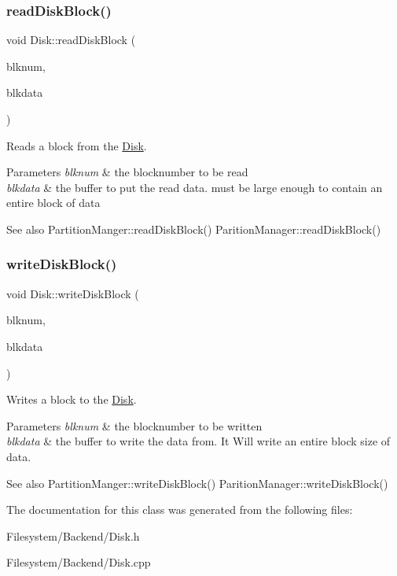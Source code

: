\subsubsection{\texorpdfstring{read\+Disk\+Block()}{readDiskBlock()}}
{\footnotesize\ttfamily void Disk\+::read\+Disk\+Block (\begin{DoxyParamCaption}\item[{Blk\+Num\+Type}]{blknum,  }\item[{char $\ast$}]{blkdata }\end{DoxyParamCaption})}

Reads a block from the \mbox{\hyperlink{classDisk}{Disk}}. 
\begin{DoxyParams}{Parameters}
{\em blknum} & the blocknumber to be read \\
\hline
{\em blkdata} & the buffer to put the read data. must be large enough to contain an entire block of data \\
\hline
\end{DoxyParams}
\begin{DoxySeeAlso}{See also}
Partition\+Manger\+::read\+Disk\+Block() Parition\+Manager\+::read\+Disk\+Block() 
\end{DoxySeeAlso}
\mbox{\label{classDisk_a5d335138f56e6b87c8ebc4b6473183e7}} 
\subsubsection{\texorpdfstring{write\+Disk\+Block()}{writeDiskBlock()}}
{\footnotesize\ttfamily void Disk\+::write\+Disk\+Block (\begin{DoxyParamCaption}\item[{Blk\+Num\+Type}]{blknum,  }\item[{char $\ast$}]{blkdata }\end{DoxyParamCaption})}

Writes a block to the \mbox{\hyperlink{classDisk}{Disk}}. 
\begin{DoxyParams}{Parameters}
{\em blknum} & the blocknumber to be written \\
\hline
{\em blkdata} & the buffer to write the data from. It Will write an entire block size of data. \\
\hline
\end{DoxyParams}
\begin{DoxySeeAlso}{See also}
Partition\+Manger\+::write\+Disk\+Block() Parition\+Manager\+::write\+Disk\+Block() 
\end{DoxySeeAlso}


The documentation for this class was generated from the following files\+:\begin{DoxyCompactItemize}
\item 
Filesystem/\+Backend/Disk.\+h\item 
Filesystem/\+Backend/Disk.\+cpp\end{DoxyCompactItemize}
